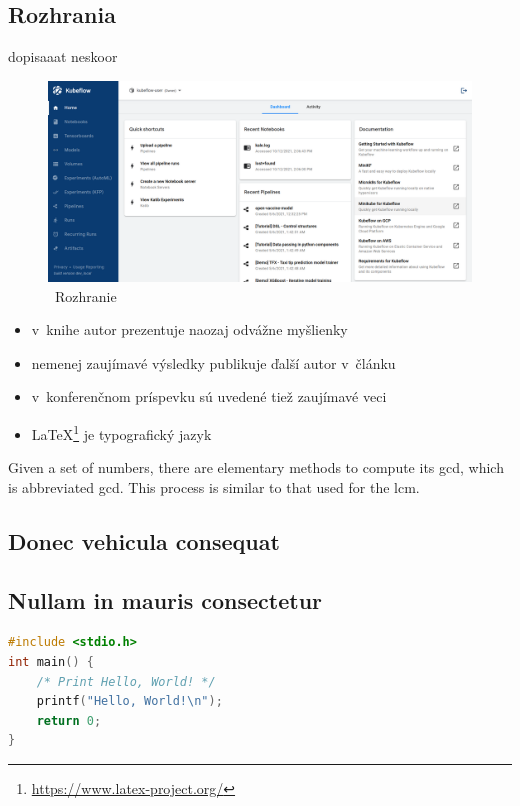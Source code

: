 \subsection{Rozhrania}

dopisaaat neskoor

\begin{figure}[!ht]
    \includegraphics[width=.9\textwidth]{figures/Rozhranie}
    \caption{\ Rozhranie \label{o:latex_friendly_zone}}
\end{figure}

\begin{itemize}
    \item v~knihe \cite{book} autor prezentuje naozaj odvážne myšlienky
    \item nemenej zaujímavé výsledky publikuje ďalší autor v~článku \cite{article} 
    \item v~konferenčnom príspevku \cite{conference} sú uvedené tiež zaujímavé veci
    \item \LaTeX{}\footnote{\url{https://www.latex-project.org/}} je typografický jazyk
\end{itemize}

Given a set of numbers, there are elementary methods to compute its \acrlong{gcd}, which is abbreviated \acrshort{gcd}. This process is similar to that used for the \acrfull{lcm}.

\subsection{Donec vehicula consequat}
\blindtext



\subsection{Nullam in mauris consectetur}
\blindtext

\begin{lstlisting}[language=C,caption={Program, ktorý pozdraví celý svet}]
#include <stdio.h>
int main() {
    /* Print Hello, World! */
    printf("Hello, World!\n");
    return 0;
}
\end{lstlisting}


